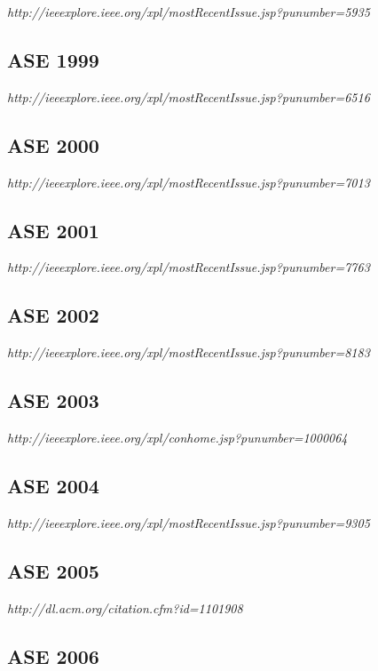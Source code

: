 {\small \em http://ieeexplore.ieee.org/xpl/mostRecentIssue.jsp?punumber=5935}

\subsection{ASE 1999}

{\small \em http://ieeexplore.ieee.org/xpl/mostRecentIssue.jsp?punumber=6516}

\subsection{ASE 2000}

{\small \em http://ieeexplore.ieee.org/xpl/mostRecentIssue.jsp?punumber=7013}

\subsection{ASE 2001}

{\small \em http://ieeexplore.ieee.org/xpl/mostRecentIssue.jsp?punumber=7763}

\subsection{ASE 2002}

{\small \em http://ieeexplore.ieee.org/xpl/mostRecentIssue.jsp?punumber=8183}

\subsection{ASE 2003}

{\small \em http://ieeexplore.ieee.org/xpl/conhome.jsp?punumber=1000064}

\subsection{ASE 2004}

{\small \em http://ieeexplore.ieee.org/xpl/mostRecentIssue.jsp?punumber=9305}

\subsection{ASE 2005}

{\small \em http://dl.acm.org/citation.cfm?id=1101908}

\subsection{ASE 2006}

